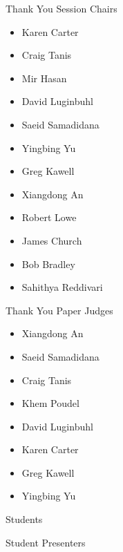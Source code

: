 \documentclass[]{beamer}
\begin{document}
\begin{frame}{Thank You Session Chairs}
    \begin{itemize}[<+(1)->]
        \item Karen Carter
        \item Craig Tanis
        \item Mir Hasan
        \item David Luginbuhl
        \item Saeid Samadidana
        \item Yingbing Yu
        \item Greg Kawell
        \item Xiangdong An
        \item Robert Lowe
        \item James Church
        \item Bob Bradley
        \item Sahithya Reddivari
    \end{itemize}
\end{frame}

\begin{frame}{Thank You Paper Judges}
    \begin{itemize}[<+(1)->]
        \item Xiangdong An
        \item Saeid Samadidana
        \item Craig Tanis
        \item Khem Poudel
        \item David Luginbuhl
        \item Karen Carter
        \item Greg Kawell
        \item Yingbing Yu
    \end{itemize}
\end{frame}

\begin{frame}{Students}
\begin{center}
    {\color{acmblue}\Huge Student Presenters}
\end{center}
\end{frame}
\end{document}
